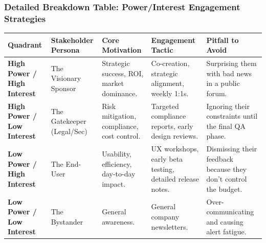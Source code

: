 \subsubsection{Detailed Breakdown Table: Power/Interest Engagement
Strategies}\label{detailed-breakdown-table-powerinterest-engagement-strategies}

\begin{longtable}[]{@{}
  >{\raggedright\arraybackslash}p{}
  >{\raggedright\arraybackslash}p{}
  >{\raggedright\arraybackslash}p{}
  >{\raggedright\arraybackslash}p{}
  >{\raggedright\arraybackslash}p{}@{}}
\toprule\noalign{}
\begin{minipage}[b]{\linewidth}\raggedright
Quadrant
\end{minipage} & \begin{minipage}[b]{\linewidth}\raggedright
Stakeholder Persona
\end{minipage} & \begin{minipage}[b]{\linewidth}\raggedright
Core Motivation
\end{minipage} & \begin{minipage}[b]{\linewidth}\raggedright
Engagement Tactic
\end{minipage} & \begin{minipage}[b]{\linewidth}\raggedright
Pitfall to Avoid
\end{minipage} \\
\midrule\noalign{}
\endhead
\bottomrule\noalign{}
\endlastfoot
\textbf{High Power / High Interest} & The Visionary Sponsor & Strategic
success, ROI, market dominance. & Co-creation, strategic alignment,
weekly 1:1s. & Surprising them with bad news in a public forum. \\
\textbf{High Power / Low Interest} & The Gatekeeper (Legal/Sec) & Risk
mitigation, compliance, cost control. & Targeted compliance reports,
early design reviews. & Ignoring their constraints until the final QA
phase. \\
\textbf{Low Power / High Interest} & The End-User & Usability,
efficiency, day-to-day impact. & UX workshops, early beta testing,
detailed release notes. & Dismissing their feedback because they don't
control the budget. \\
\textbf{Low Power / Low Interest} & The Bystander & General awareness. &
General company newsletters. & Over-communicating and causing alert
fatigue. \\
\end{longtable}

